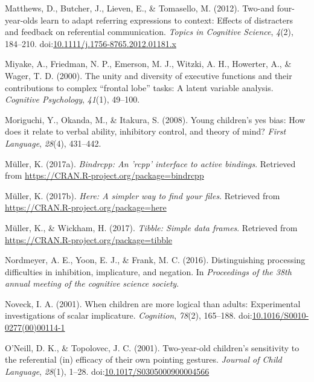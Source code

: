 \documentclass[man]{apa6}
\begin{document}
\hypertarget{ref-matthews2012}{}
Matthews, D., Butcher, J., Lieven, E., \& Tomasello, M. (2012). Two-and
four-year-olds learn to adapt referring expressions to context: Effects
of distracters and feedback on referential communication. \emph{Topics
in Cognitive Science}, \emph{4}(2), 184--210.
doi:\href{https://doi.org/10.1111/j.1756-8765.2012.01181.x}{10.1111/j.1756-8765.2012.01181.x}

\hypertarget{ref-miyake2000unity}{}
Miyake, A., Friedman, N. P., Emerson, M. J., Witzki, A. H., Howerter,
A., \& Wager, T. D. (2000). The unity and diversity of executive
functions and their contributions to complex ``frontal lobe'' tasks: A
latent variable analysis. \emph{Cognitive Psychology}, \emph{41}(1),
49--100.

\hypertarget{ref-moriguchi2008young}{}
Moriguchi, Y., Okanda, M., \& Itakura, S. (2008). Young children's yes
bias: How does it relate to verbal ability, inhibitory control, and
theory of mind? \emph{First Language}, \emph{28}(4), 431--442.

\hypertarget{ref-R-bindrcpp}{}
Müller, K. (2017a). \emph{Bindrcpp: An 'rcpp' interface to active
bindings}. Retrieved from
\url{https://CRAN.R-project.org/package=bindrcpp}

\hypertarget{ref-R-here}{}
Müller, K. (2017b). \emph{Here: A simpler way to find your files}.
Retrieved from \url{https://CRAN.R-project.org/package=here}

\hypertarget{ref-R-tibble}{}
Müller, K., \& Wickham, H. (2017). \emph{Tibble: Simple data frames}.
Retrieved from \url{https://CRAN.R-project.org/package=tibble}

\hypertarget{ref-nordmeyer2016}{}
Nordmeyer, A. E., Yoon, E. J., \& Frank, M. C. (2016). Distinguishing
processing difficulties in inhibition, implicature, and negation. In
\emph{Proceedings of the 38th annual meeting of the cognitive science
society}.

\hypertarget{ref-noveck2001}{}
Noveck, I. A. (2001). When children are more logical than adults:
Experimental investigations of scalar implicature. \emph{Cognition},
\emph{78}(2), 165--188.
doi:\href{https://doi.org/10.1016/S0010-0277(00)00114-1}{10.1016/S0010-0277(00)00114-1}

\hypertarget{ref-oneill2001}{}
O'Neill, D. K., \& Topolovec, J. C. (2001). Two-year-old children's
sensitivity to the referential (in) efficacy of their own pointing
gestures. \emph{Journal of Child Language}, \emph{28}(1), 1--28.
doi:\href{https://doi.org/10.1017/S0305000900004566}{10.1017/S0305000900004566}
\end{document}
